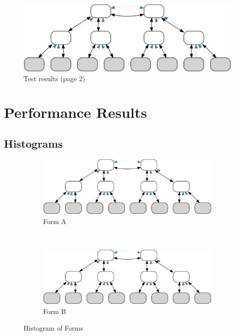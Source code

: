 \begin{figure}[H]
    \centering
    \includegraphics[width=.9\textwidth,frame,page=1]{resources/images/example3}
    \caption{Test results (page 2)}\label{fig:test:result2}
\end{figure}

\section{Performance Results}

\subsection{Histograms}


\begin{figure}[H]
    \begin{subfigure}[b]{.5\textwidth}
      \centering
      \includegraphics[width=.95\textwidth,frame]{resources/images/example3}
      \caption{Form A}
    \end{subfigure}~\begin{subfigure}[b]{.5\textwidth}
      \centering
      \includegraphics[width=.95\textwidth,frame]{resources/images/example3}
      \caption{Form B}
    \end{subfigure}
    \caption{Histogram of Forms}\label{fig:eval:perf:hist:forms}
\end{figure}


